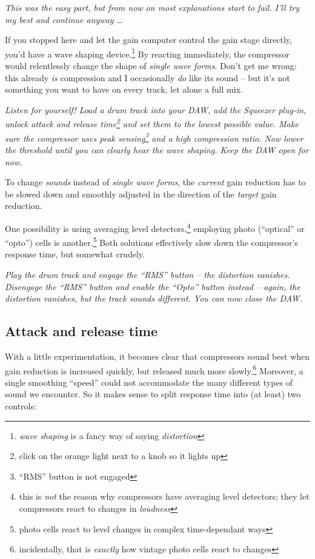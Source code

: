 \emph{This was the easy part, but from now on most explanations start
  to fail.  I'll try my best and continue anyway \dots}

If you stopped here and let the gain computer control the gain stage
directly, you'd have a wave shaping device.\footnote{\emph{wave
    shaping} is a fancy way of saying \emph{distortion}} By reacting
immediately, the compressor would relentlessly change the shape of
\emph{single wave forms}.  Don't get me wrong: this already \emph{is}
compression and I occasionally \emph{do} like its sound -- but it's
not something you want to have on every track, let alone a full mix.

\emph{Listen for yourself!  Load a drum track into your DAW, add the
  Squeezer plug-in, unlock attack and release time\footnote{click on
    the orange light next to a knob so it lights up} and set them to
  the lowest possible value.  Make sure the compressor uses peak
  sensing\footnote{``RMS'' button is not engaged} and a high
  compression ratio.  Now lower the threshold until you can clearly
  hear the wave shaping.  Keep the DAW open for now.}

To change \emph{sounds} instead of \emph{single wave forms}, the
\emph{current} gain reduction has to be slowed down and smoothly
adjusted in the direction of the \emph{target} gain reduction.

One possibility is using averaging level detectors,\footnote{this is
  \emph{not} the reason why compressors have averaging level
  detectors; they let compressors react to changes in \emph{loudness}}
employing photo (``optical'' or ``opto'') cells is
another.\footnote{photo cells react to level changes in complex
  time-dependant ways} Both solutions effectively slow down the
compressor's response time, but somewhat crudely.

\emph{Play the drum track and engage the ``RMS'' button -- the
  distortion vanishes.  Disengage the ``RMS'' button and enable the
  ``Opto'' button instead -- again, the distortion vanishes, but the
  track sounds different.  You can now close the DAW.}

\subsection{Attack and release time}
\label{sec:attack_and_release_time}

With a little experimentation, it becomes clear that compressors sound
best when gain reduction is increased quickly, but released much more
slowly.\footnote{incidentally, that is \emph{exactly} how vintage
  photo cells react to changes} Moreover, a single smoothing ``speed''
could not accommodate the many different types of sound we encounter.
So it makes sense to split response time into (at least) two controls:

